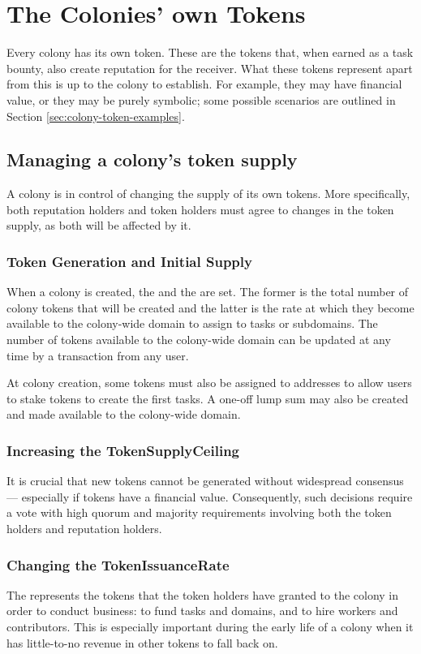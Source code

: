 \section{The Colonies' own Tokens}\label{sec:colony-tokens}
Every colony has its own token. These are the tokens that, when earned as a task bounty, also create reputation for the receiver. What these tokens represent apart from this is up to the colony to establish. For example, they may have financial value, or they may be purely symbolic; some possible scenarios are outlined in Section \ref{sec:colony-token-examples}.

\subsection{Managing a colony's token supply}\label{sec:colony-token-management}
A colony is in control of changing the supply of its own tokens. More specifically, both reputation holders and token holders must agree to changes in the token supply, as both will be affected by it.

\subsubsection{Token Generation and Initial Supply}
When a colony is created, the  and the  are set. The former is the total number of colony tokens that will be created and the latter is the rate at which they become available to the colony-wide domain to assign to tasks or subdomains. The number of tokens available to the colony-wide domain can be updated at any time by a transaction from any user.

At colony creation, some tokens must also be assigned to addresses to allow users to stake tokens to create the first tasks. A one-off lump sum may also be created and made available to the colony-wide domain.

\subsubsection{Increasing the TokenSupplyCeiling}
 It is crucial that new tokens cannot be generated without widespread consensus --- especially if tokens have a financial value. Consequently, such decisions require a vote with high quorum and majority requirements involving both the token holders and reputation holders.

\subsubsection{Changing the TokenIssuanceRate}
The  represents the tokens that the token holders have granted to the colony in order to conduct business: to fund tasks and domains, and to hire workers and contributors. This is especially important during the early life of a colony when it has little-to-no revenue in other tokens to fall back on.


